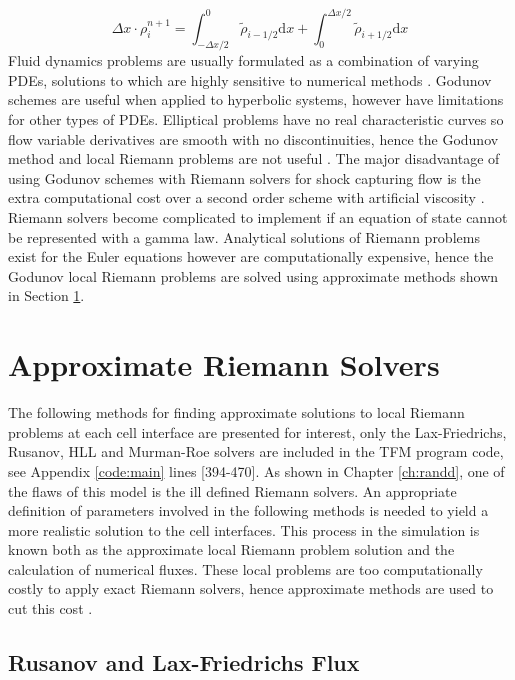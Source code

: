 	\begin{equation}
		\Delta x\cdot \rho_i^{n+1}=\int_{-\Delta x/2}^0\tilde \rho_{i-1/2}\mathrm{d}x +\int_0^{\Delta x/2}\tilde \rho_{i+1/2}\mathrm{d}x\label{eq:GodunovUpdate}
	\end{equation}
	Fluid dynamics problems are usually formulated as a combination of varying PDEs, solutions to which are highly sensitive to numerical methods \cite{Chung02}. Godunov schemes are useful when applied to hyperbolic systems, however have limitations for other types of PDEs. Elliptical problems have no real characteristic curves so flow variable derivatives are smooth with no discontinuities, hence the Godunov method and local Riemann problems are not useful \cite{Chung02}. The major disadvantage of using Godunov schemes with Riemann solvers for shock capturing flow is the extra computational cost over a second order scheme with artificial viscosity \cite{Woodward84}. Riemann solvers become complicated to implement if an equation of state cannot be represented with a gamma law. Analytical solutions of Riemann problems exist for the Euler equations however are computationally expensive, hence the Godunov local Riemann problems are solved using approximate methods shown in Section \ref{sec:RSFC}.	

\section{Approximate Riemann Solvers}
\label{sec:RSFC}

	The following methods for finding approximate solutions to local Riemann problems at each cell interface are presented for interest, only the Lax-Friedrichs, Rusanov, HLL and Murman-Roe solvers are included in the TFM program code, see Appendix \ref{code:main} lines [394-470]. As shown in Chapter \ref{ch:randd}, one of the flaws of this model is the ill defined Riemann solvers. An appropriate definition of parameters involved in the following methods is needed to yield a more realistic solution to the cell interfaces. This process in the simulation is known both as the approximate local Riemann problem solution and the calculation of numerical fluxes. These local problems are too computationally costly to apply exact Riemann solvers, hence approximate methods are used to cut this cost \cite{Laney98}.
	
\subsection{Rusanov and Lax-Friedrichs Flux}
\label{sec:RLF}

